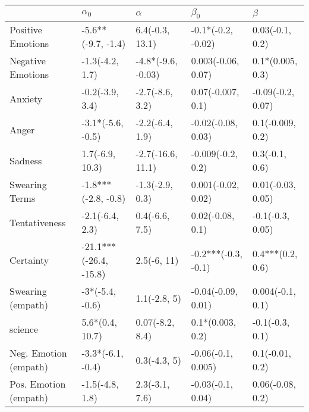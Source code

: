 \begin{tabular}{lllll}
\toprule
{} &              $\alpha_0$ &            $\alpha$ &            $\beta_0$ &            $\beta$ \\
\midrule
Positive Emotions     &      -5.6**(-9.7, -1.4) &     6.4(-0.3, 13.1) &   -0.1*(-0.2, -0.02) &    0.03(-0.1, 0.2) \\
Negative Emotions     &         -1.3(-4.2, 1.7) &  -4.8*(-9.6, -0.03) &   0.003(-0.06, 0.07) &   0.1*(0.005, 0.3) \\
Anxiety               &         -0.2(-3.9, 3.4) &     -2.7(-8.6, 3.2) &    0.07(-0.007, 0.1) &  -0.09(-0.2, 0.07) \\
Anger                 &       -3.1*(-5.6, -0.5) &     -2.2(-6.4, 1.9) &   -0.02(-0.08, 0.03) &   0.1(-0.009, 0.2) \\
Sadness               &         1.7(-6.9, 10.3) &   -2.7(-16.6, 11.1) &    -0.009(-0.2, 0.2) &     0.3(-0.1, 0.6) \\
Swearing Terms        &     -1.8***(-2.8, -0.8) &     -1.3(-2.9, 0.3) &   0.001(-0.02, 0.02) &  0.01(-0.03, 0.05) \\
Tentativeness         &         -2.1(-6.4, 2.3) &      0.4(-6.6, 7.5) &     0.02(-0.08, 0.1) &   -0.1(-0.3, 0.05) \\
Certainty             &  -21.1***(-26.4, -15.8) &         2.5(-6, 11) &  -0.2***(-0.3, -0.1) &   0.4***(0.2, 0.6) \\
Swearing (empath)     &         -3*(-5.4, -0.6) &        1.1(-2.8, 5) &   -0.04(-0.09, 0.01) &   0.004(-0.1, 0.1) \\
science               &         5.6*(0.4, 10.7) &     0.07(-8.2, 8.4) &     0.1*(0.003, 0.2) &    -0.1(-0.3, 0.1) \\
Neg. Emotion (empath) &       -3.3*(-6.1, -0.4) &        0.3(-4.3, 5) &   -0.06(-0.1, 0.005) &    0.1(-0.01, 0.2) \\
Pos. Emotion (empath) &         -1.5(-4.8, 1.8) &      2.3(-3.1, 7.6) &    -0.03(-0.1, 0.04) &   0.06(-0.08, 0.2) \\
\bottomrule
\end{tabular}

